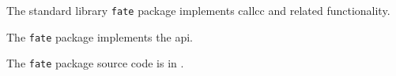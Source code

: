 
The standard library {\tt fate} package implements callcc and related functionality.

The {\tt fate} package implements the  api.

The {\tt fate} package source code is in .





